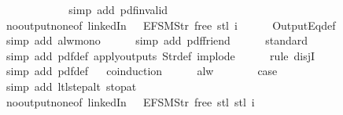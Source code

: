 \begin{isabellebody}
\ \ \ \ \ \isamarkupfalse%
\isanewline
\ \ \ \ \ \isamarkupfalse%
\ {\isacharparenleft}simp\ add{\isacharcolon}\ pdf{\isacharunderscore}{}{\isacharunderscore}invalid{\isacharparenright}\isanewline
\ \ \ \ \isamarkupfalse%
\ no{\isacharunderscore}output{\isacharunderscore}none{\isacharbrackleft}of\ linkedIn\ {\isachardoublequoteopen}{\isacharless}{}\ {\isacharcolon}{\isacharequal}\ EFSM{\isachardot}Str\ {\isacharprime}{\isacharprime}free{\isacharprime}{\isacharprime}{\isachargreater}{\isachardoublequoteclose}\ {\isachardoublequoteopen}{\isacharparenleft}stl\ i{\isacharparenright}{\isachardoublequoteclose}{\isacharbrackright}\isanewline
\ \ \ \ \isamarkupfalse%
\ OutputEq{\isacharunderscore}def\isanewline
\ \ \ \ \ \isamarkupfalse%
\ {\isacharparenleft}simp\ add{\isacharcolon}\ alw{\isacharunderscore}mono{\isacharparenright}\isanewline
\ \ \ \ \isamarkupfalse%
\ {\isacharparenleft}simp\ add{\isacharcolon}\ pdf{\isacharunderscore}friend{\isacharparenright}\isanewline
\ \ \ \ \isamarkupfalse%
\ standard\isanewline
\ \ \ \ \ \isamarkupfalse%
\ {\isacharparenleft}simp\ add{\isacharcolon}\ pdf{\isacharunderscore}def\ apply{\isacharunderscore}outputs\ Str{\isacharunderscore}def\ implode{\isacharparenright}\isanewline
\ \ \ \ \isamarkupfalse%
\ {\isacharparenleft}rule\ disjI{}{\isacharparenright}\isanewline
\ \ \ \ \isamarkupfalse%
\ {\isacharparenleft}simp\ add{\isacharcolon}\ pdf{\isacharunderscore}def{\isacharparenright}\isanewline
\ \ \isamarkupfalse%
{\isacharparenleft}coinduction{\isacharparenright}\isanewline
\ \ \ \ \isamarkupfalse%
\ alw\isanewline
\ \ \ \ \isamarkupfalse%
\ \isamarkupfalse%
\ {\isacharquery}case\isanewline
\ \ \ \ \ \ \isamarkupfalse%
\ {\isacharparenleft}simp\ add{\isacharcolon}\ ltl{\isacharunderscore}step{\isacharunderscore}alt\ stop{\isacharunderscore}at{\isacharunderscore}{}{\isacharparenright}\isanewline
\ \ \ \ \isamarkupfalse%
\ no{\isacharunderscore}output{\isacharunderscore}none{\isacharbrackleft}of\ linkedIn\ {\isachardoublequoteopen}{\isacharless}{}\ {\isacharcolon}{\isacharequal}\ EFSM{\isachardot}Str\ {\isacharprime}{\isacharprime}free{\isacharprime}{\isacharprime}{\isachargreater}{\isachardoublequoteclose}\ {\isachardoublequoteopen}stl\ {\isacharparenleft}stl\ i{\isacharparenright}{\isachardoublequoteclose}{\isacharbrackright}\isanewline

\end{isabellebody}
